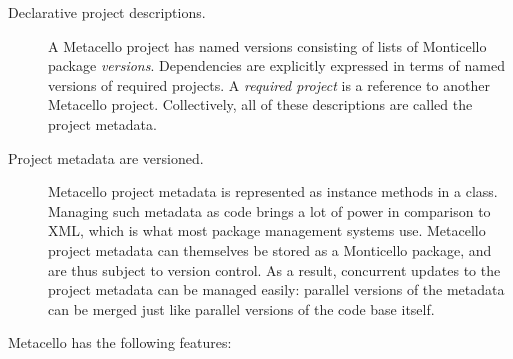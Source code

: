 \documentclass[a4paper,10pt,twoside]{book}
\begin{document}
\begin{description}
\item[Declarative project descriptions.] A Metacello project has named versions consisting of lists of Monticello package \emph{versions}. Dependencies are explicitly expressed in terms of named versions of required projects. A \emph{required project} is a reference to another Metacello project.  Collectively, all of these descriptions are called the project metadata.

\item[Project metadata are versioned.] Metacello project metadata is represented as instance methods in a class. Managing such metadata as code brings a lot of power in comparison to XML, which is what most package management systems use. Metacello project metadata can themselves be stored as a Monticello package, and are thus subject to version control. 
As a result,
concurrent updates to the project metadata can be managed easily: parallel versions of the metadata can be merged just like parallel versions of the code base itself. 



\end{description}

Metacello has the following features:
\end{document}
